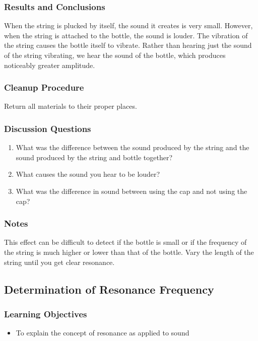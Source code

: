 \subsubsection*{Results and Conclusions}
When the string is plucked by itself, the sound it creates is very small.  However, when the string is attached to the bottle, the sound is louder.  The vibration of the string causes the bottle itself to vibrate.  Rather than hearing just the sound of the string vibrating, we hear the sound of the bottle, which produces noticeably greater amplitude.

\subsubsection*{Cleanup Procedure}
Return all materials to their proper places.

\subsubsection*{Discussion Questions}
\begin{enumerate}
\item{What was the difference between the sound produced by the string and the sound produced by the string and bottle together?}
\item{What causes the sound you hear to be louder?}
\item{What was the difference in sound between using the cap and not using the cap?}
\end{enumerate}

\subsubsection*{Notes}
This effect can be difficult to detect if the bottle is small or if the frequency of the string is much higher or lower than that of the bottle.  Vary the length of the string until you get clear resonance.

\subsection{Determination of Resonance Frequency}

\subsubsection*{Learning Objectives}
\begin{itemize}
\item{To explain the concept of resonance as applied to sound} 
\end{itemize}

